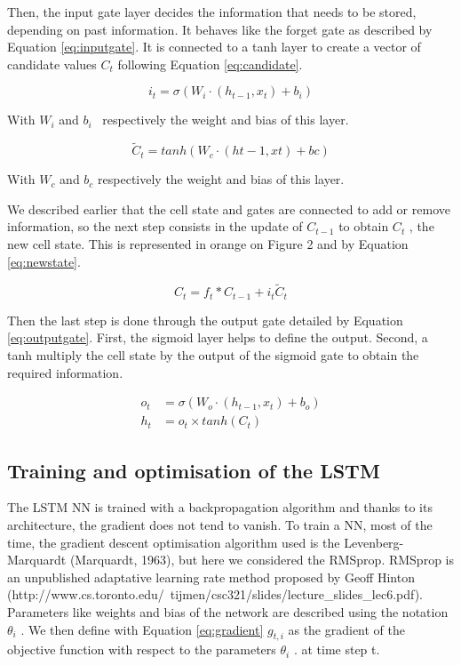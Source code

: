 Then, the input gate layer decides the information that needs to be stored, depending on past information. 
It behaves like the forget gate as described by Equation \ref{eq:inputgate}. It is connected to a 
tanh layer to create a vector of candidate values \(  C_{t} \)  following Equation \ref{eq:candidate}.


\begin{equation}\label{eq:inputgate}
 i_{t} = \sigma  \left(W_i \cdot \left( h_{t-1}, x_t \right) + b_i \right)
\end{equation}


With  \( W_{i} \)  and  \( b_{i} \) \  respectively the weight and bias of this layer. 

\begin{equation}\label{eq:candidate}
 \tilde{C}_{t} = tanh \left( W_{c} \cdot  \left( ht-1,xt \right) +bc \right)
\end{equation}


With  \( W_{c} \)  and  \( b_{c} \)  respectively the weight and bias of this layer. 


We described earlier that the cell state and gates are connected to add or remove information, 
so the next step consists in the update of  \( C_{t-1} \) to obtain  \( C_{t} \) , 
the new cell state. This is represented in orange on Figure 2 and by Equation \ref{eq:newstate}. 



\begin{equation}\label{eq:newstate}
 C_{t} = f_{t} \ast C_{t-1} + i_{t}\tilde{C}_{t}
\end{equation}

Then the last step is done through the output gate detailed by Equation \ref{eq:outputgate}. First, the sigmoid layer 
helps to define the output. Second, a tanh multiply the cell state by the output of the sigmoid gate to 
obtain the required information.


\begin{align} \label{eq:outputgate}
	o_t &= \sigma \left( W_{o} \cdot (h_{t-1}, x_t) + b_{o} \right) \\
	h_t &= o_t \times tanh(C_t)
\end{align}

\subsection{Training and optimisation of the LSTM}


The LSTM NN is trained with a backpropagation algorithm and thanks to its architecture, 
the gradient does not tend to vanish. To train a NN, most of the time, the gradient descent 
optimisation algorithm used is the Levenberg-Marquardt (Marquardt, 1963), but here we 
considered the RMSprop. RMSprop is an unpublished adaptative learning rate method proposed by 
Geoff Hinton (http://www.cs.toronto.edu/~tijmen/csc321/slides/lecture\_slides\_lec6.pdf). 
Parameters like weights and bias of the network are described using the notation  \(  \theta _{i} \) . 
We then define with Equation \ref{eq:gradient}  \( g_{t,i} \)  as the gradient of the 
objective function with respect to the parameters \(   \theta _{i} \) . at time step t. 


